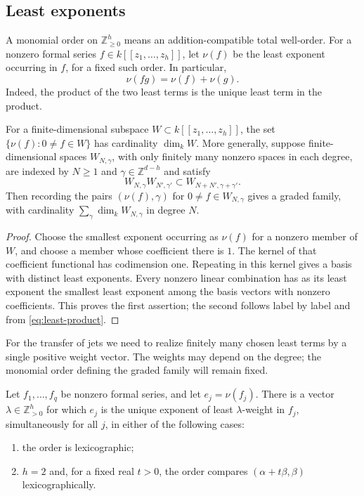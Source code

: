 \subsection{Least exponents}

A monomial order on $\mathbb{Z}_{\geq0}^h$ means an addition-compatible total well-order.  For a nonzero formal series $f\in k[[z_1,\ldots,z_h]]$, let $\nu(f)$ be the least exponent occurring in $f$, for a fixed such order.  In particular,
\begin{equation}\label{eq:least-product}
 \nu(fg)=\nu(f)+\nu(g).
\end{equation}
Indeed, the product of the two least terms is the unique least term in the product.

\begin{lemma}\label{lem:least-terms}
For a finite-dimensional subspace $W\subset k[[z_1,\ldots,z_h]]$, the set $\{\nu(f):0\neq f\in W\}$ has cardinality $\dim_k W$. More generally, suppose finite-dimensional spaces $W_{N,\gamma}$, with only finitely many nonzero spaces in each degree, are indexed by $N\geq1$ and $\gamma\in\mathbb{Z}^{d-h}$ and satisfy
\[
 W_{N,\gamma}W_{N',\gamma'}
 \subset W_{N+N',\gamma+\gamma'}.
\]
Then recording the pairs $(\nu(f),\gamma)$ for $0\neq f\in W_{N,\gamma}$ gives a graded family, with cardinality $\sum_\gamma\dim_k W_{N,\gamma}$ in degree $N$.
\end{lemma}

\begin{proof}
Choose the smallest exponent occurring as $\nu(f)$ for a nonzero member of $W$, and choose a member whose coefficient there is $1$.  The kernel of that coefficient functional has codimension one.  Repeating in this kernel gives a basis with distinct least exponents.  Every nonzero linear combination has as its least exponent the smallest least exponent among the basis vectors with nonzero coefficients.  This proves the first assertion; the second follows label by label and from \eqref{eq:least-product}.
\end{proof}

For the transfer of jets we need to realize finitely many chosen least terms by a single positive weight vector.  The weights may depend on the degree; the monomial order defining the graded family will remain fixed.

\begin{lemma}\label{lem:exposing-weights}
Let $f_1,\ldots,f_q$ be nonzero formal series, and let $e_j=\nu(f_j)$. There is a vector $\lambda\in\mathbb{Z}_{>0}^h$ for which $e_j$ is the unique exponent of least $\lambda$-weight in $f_j$, simultaneously for all $j$, in either of the following cases:
\begin{enumerate}[label=\textup{(\roman*)}]
\item the order is lexicographic;
\item $h=2$ and, for a fixed real $t>0$, the order compares
$(\alpha+t\beta,\beta)$ lexicographically.
\end{enumerate}
\end{lemma}


